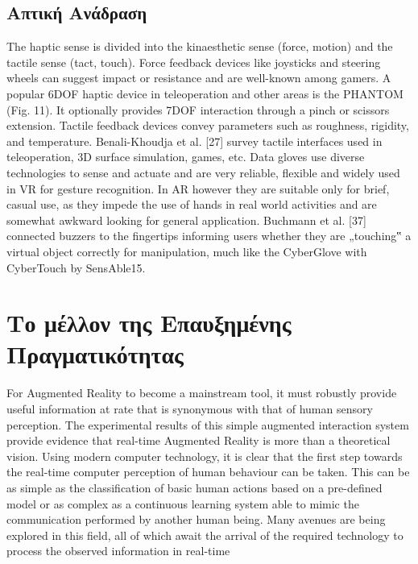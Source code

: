 \subsection{Απτική Ανάδραση }

The haptic sense is divided into the kinaesthetic sense
(force, motion) and the tactile sense (tact, touch). Force
feedback devices like joysticks and steering wheels can
suggest impact or resistance and are well-known among
gamers. A popular 6DOF haptic device in teleoperation and
other areas is the PHANTOM (Fig. 11). It optionally provides
7DOF interaction through a pinch or scissors extension.
Tactile feedback devices convey parameters such as roughness,
rigidity, and temperature. Benali-Khoudja et al. [27]
survey tactile interfaces used in teleoperation, 3D surface
simulation, games, etc.
Data gloves use diverse technologies to sense and actuate
and are very reliable, flexible and widely used in VR for
gesture recognition. In AR however they are suitable only for
brief, casual use, as they impede the use of hands in real
world activities and are somewhat awkward looking for
general application. Buchmann et al. [37] connected buzzers
to the fingertips informing users whether they are „touching‟
a virtual object correctly for manipulation, much like the
CyberGlove with CyberTouch by SensAble15.

\section{Το μέλλον της Επαυξημένης Πραγματικότητας}

For Augmented Reality to become a mainstream tool, it must robustly provide useful information at rate that is synonymous with that of human sensory perception. The experimental results of this simple augmented interaction system provide evidence that real-time Augmented Reality is more than a theoretical vision. Using modern computer technology, it is clear that the first step towards the real-time computer perception of human behaviour can be taken. This can be as simple as the classification of basic human actions based on a pre-defined model or as complex as a continuous learning system able to mimic the communication performed by another human being. Many avenues are being explored in this field, all of which await the arrival of the required technology to process the observed information in real-time







